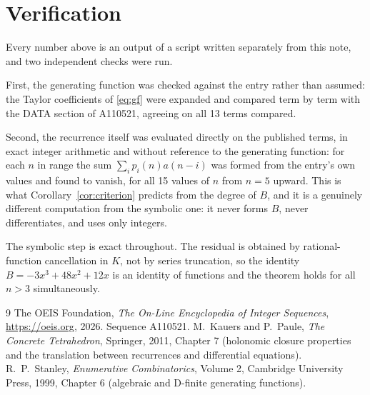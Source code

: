 \documentclass[11pt,a4paper]{article}
\theoremstyle{plain}
\theoremstyle{definition}
\begin{document}
\section{Verification}

Every number above is an output of a script written separately from this note, and two
independent checks were run.

First, the generating function was checked against the entry rather than assumed: the
Taylor coefficients of \eqref{eq:gf} were expanded and compared term by term with the DATA
section of A110521, agreeing on all 13 terms compared.

Second, the recurrence itself was evaluated directly on the published terms, in exact
integer arithmetic and without reference to the generating function: for each $n$ in range
the sum $\sum_{i}p_{i}(n)a(n-i)$ was formed from the entry's own values and found to
vanish, for all 15 values of $n$ from $n=5$ upward. This is what
Corollary~\ref{cor:criterion} predicts from the degree of $B$, and it is a genuinely
different computation from the symbolic one: it never forms $B$, never differentiates, and
uses only integers.

The symbolic step is exact throughout. The residual is obtained by rational-function
cancellation in $K$, not by series truncation, so the identity $B=- 3 x^{3} + 48 x^{2} + 12 x$ is an
identity of functions and the theorem holds for all $n>3$ simultaneously.

\begin{thebibliography}{9}
 The OEIS Foundation, \emph{The On-Line Encyclopedia of Integer Sequences},
\url{https://oeis.org}, 2026. Sequence A110521.
 M.~Kauers and P.~Paule, \emph{The Concrete Tetrahedron}, Springer, 2011,
Chapter 7 (holonomic closure properties and the translation between recurrences and
differential equations).
 R.~P.~Stanley, \emph{Enumerative Combinatorics}, Volume 2, Cambridge
University Press, 1999, Chapter 6 (algebraic and D-finite generating functions).
\end{thebibliography}
\end{document}
